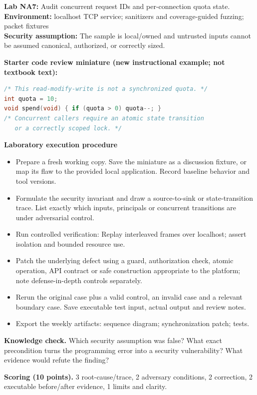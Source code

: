 \documentclass[10pt,letterpaper]{article}
\begin{document}
\begin{insight}\textbf{Lab NA7:} Audit concurrent request IDs and per-connection quota state.\\\textbf{Environment:} localhost TCP service; sanitizers and coverage-guided fuzzing; packet fixtures\\\textbf{Security assumption:} The sample is local/owned and untrusted inputs cannot be assumed canonical, authorized, or correctly sized.\end{insight}
\textbf{Starter code review miniature (new instructional example; not textbook text):}
\begin{lstlisting}[language=C]
/* This read-modify-write is not a synchronized quota. */
int quota = 10;
void spend(void) { if (quota > 0) quota--; }
/* Concurrent callers require an atomic state transition
   or a correctly scoped lock. */
\end{lstlisting}
\textbf{Laboratory execution procedure}
\begin{itemize}[leftmargin=*,itemsep=2pt]
\item Prepare a fresh working copy. Save the miniature as a discussion fixture, or map its flaw to the provided local application. Record baseline behavior and tool versions.
\item Formulate the security invariant and draw a source-to-sink or state-transition trace. List exactly which inputs, principals or concurrent transitions are under adversarial control.
\item Run controlled verification: Replay interleaved frames over localhost; assert isolation and bounded resource use.
\item Patch the underlying defect using a guard, authorization check, atomic operation, API contract or safe construction appropriate to the platform; note defense-in-depth controls separately.
\item Rerun the original case plus a valid control, an invalid case and a relevant boundary case. Save executable test input, actual output and review notes.
\item Export the weekly artifacts: sequence diagram; synchronization patch; tests.
\end{itemize}
\textbf{Knowledge check.} Which security assumption was false? What exact precondition turns the programming error into a security vulnerability? What evidence would refute the finding?

\textbf{Scoring (10 points).} 3 root-cause/trace, 2 adversary conditions, 2 correction, 2 executable before/after evidence, 1 limits and clarity.
\end{document}
